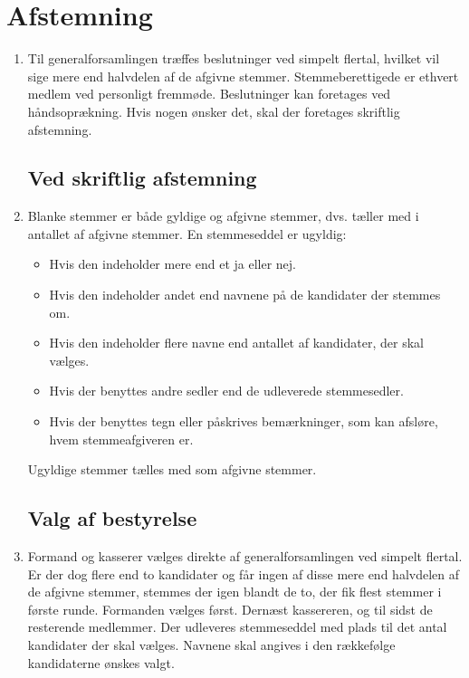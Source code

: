 \documentclass[a4paper, 10pt]{article}
\newenvironment{stykenum}{
  \begin{enumerate}[%
    label=Stk.~\arabic*., ref=\textsection~\theenumi~Stk.~\arabic*, start=1]
}{\end{enumerate}}
\begin{document}
\section{Afstemning}
\begin{stykenum}
    
\item Til generalforsamlingen træffes beslutninger ved simpelt flertal,
hvilket vil sige mere end halvdelen af de afgivne stemmer.
Stemmeberettigede er ethvert med\-lem ved personligt fremmøde.
Beslutninger kan foretages ved håndsoprækning. Hvis nogen ønsker det,
skal der foretages skriftlig afstemning.

\subsection*{Ved skriftlig afstemning}

\item Blanke stemmer er både gyldige og afgivne stemmer, dvs. tæller med i
antallet af afgivne stemmer. En stemmeseddel er ugyldig:

\begin{itemize}

\item Hvis den indeholder mere end et ja eller nej.

\item Hvis den indeholder andet end navnene på de kandidater der
stemmes om.

\item Hvis den indeholder flere navne end antallet af kandidater, der
skal væl\-ges.

\item Hvis der benyttes andre sedler end de udleverede stemmesedler.

\item Hvis der benyttes tegn eller påskrives bemærkninger, som kan
afsløre, hvem stemmeafgiveren er.

\end{itemize}

Ugyldige stemmer tælles med som afgivne stemmer.

\subsection*{Valg af bestyrelse}

\item Formand og kasserer vælges direkte af generalforsamlingen ved simpelt
flertal. Er der dog flere end to kandidater og får ingen af disse mere
end halvdelen af de afgivne stemmer, stemmes der igen blandt de to,
der fik flest stemmer i første runde. Formanden vælges først. Dernæst
kassereren, og til sidst de resterende medlemmer. Der udleveres
stemmeseddel med plads til det antal kandidater der skal vælges.
Navnene skal angives i den rækkefølge kandidaterne ønskes valgt.


\end{stykenum}
\end{document}
